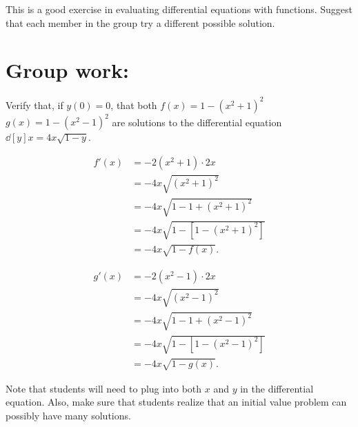 \documentclass[handout, instructornotes]{ximera}
\begin{document}
\begin{instructorNotes}
This is a good exercise in evaluating differential equations with functions.  
Suggest that each member in the group try a different possible solution.
\end{instructorNotes}








\section{Group work:}












\begin{problem}
Verify that, if $y(0)=0$, that both $f(x)=1-(x^2+1)^2$  $g(x) = 1 - (x^2-1)^2$ are solutions to the differential equation $\dd[y]{x} = 4x\sqrt{1-y}$.
	\begin{freeResponse}
		\begin{align*}
		f'(x) &= -2(x^2+1) \cdot 2x  \\
		&= -4x \sqrt{(x^2+1)^2}  \\
		&= -4x \sqrt{1-1+(x^2+1)^2}  \\
		&= -4x \sqrt{1 - \left[1-(x^2+1)^2 \right]}  \\
		&= -4x \sqrt{1-f(x)}.
		\end{align*}
		
		\vskip 5pt
		
		\begin{align*}
		g'(x) &= -2(x^2-1) \cdot 2x  \\
		&= -4x \sqrt{(x^2-1)^2}  \\
		&= -4x \sqrt{1-1+(x^2-1)^2}  \\
		&= -4x \sqrt{1 - \left[1-(x^2-1)^2 \right]}  \\
		&= -4x \sqrt{1-g(x)}.
		\end{align*}
	\end{freeResponse}
		
\end{problem}

\begin{instructorNotes}
Note that students will need to plug into both $x$ and $y$ in the differential equation.  
Also, make sure that students realize that an initial value problem can possibly have many solutions.
\end{instructorNotes}
\end{document}
